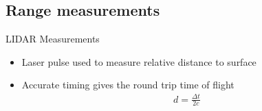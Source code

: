 \documentclass[11pt,professionalfonts]{beamer}
\begin{document}
\subsection[LIDAR]{Range measurements}
\begin{frame}{LIDAR Measurements }
    \begin{itemize}
        \item<1-> Laser pulse used to measure relative distance to surface
        \item<2-> Accurate timing gives the round trip time of flight
            \begin{align*}
                d = \frac{\Delta t}{2 c}
            \end{align*}
    \end{itemize}
    
\end{frame}
\end{document}
